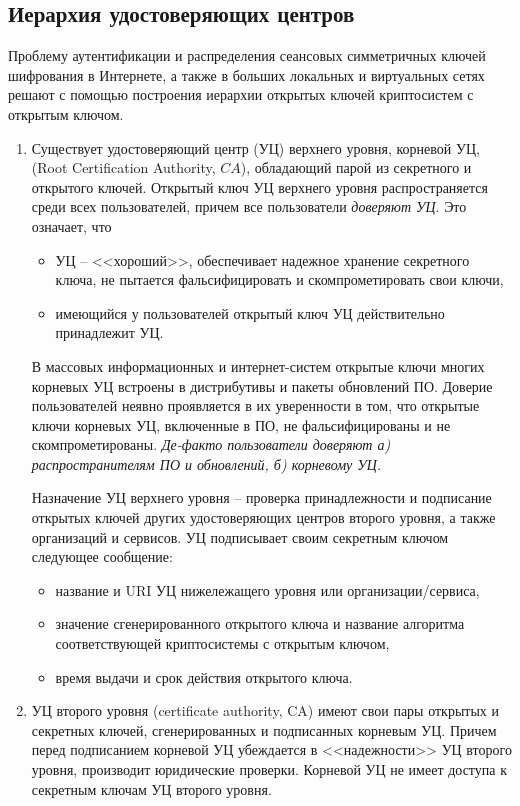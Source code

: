 ﻿\subsection{Иерархия удостоверяющих центров}

Проблему аутентификации и распределения сеансовых симметричных ключей шифрования в Интернете, а также в больших локальных и виртуальных сетях решают с помощью построения иерархии открытых ключей криптосистем с открытым ключом.

\begin{enumerate}
    \item Существует удостоверяющий центр (УЦ) верхнего уровня, корневой УЦ, (Root Certification Authority, $CA$), обладающий парой из секретного и открытого ключей. Открытый ключ УЦ верхнего уровня распространяется среди всех пользователей, причем все пользователи \emph{доверяют УЦ}. Это означает, что
        \begin{itemize}
            \item УЦ -- <<хороший>>, обеспечивает надежное хранение секретного ключа, не пытается фальсифицировать и скомпрометировать свои ключи,
            \item имеющийся у пользователей открытый ключ УЦ действительно принадлежит УЦ.
        \end{itemize}
        В массовых информационных и интернет-систем открытые ключи многих корневых УЦ встроены в дистрибутивы и пакеты обновлений ПО. Доверие пользователей неявно проявляется в их уверенности в том, что открытые ключи корневых УЦ, включенные в ПО, не фальсифицированы и не скомпрометированы. \emph{Де-факто пользователи доверяют а) распространителям ПО и обновлений, б) корневому УЦ.}

        Назначение УЦ верхнего уровня -- проверка принадлежности и подписание открытых ключей других удостоверяющих центров второго уровня, а также организаций и сервисов. УЦ подписывает своим секретным ключом следующее сообщение:
        \begin{itemize}
            \item название и URI УЦ нижележащего уровня или организации/сервиса,
            \item значение сгенерированного открытого ключа и название алгоритма соответствующей криптосистемы с открытым ключом,
            \item время выдачи и срок действия открытого ключа.
        \end{itemize}

    \item УЦ второго уровня (certificate authority, CA) имеют свои пары открытых и секретных ключей, сгенерированных и подписанных корневым УЦ. Причем перед подписанием корневой УЦ убеждается в <<надежности>> УЦ второго уровня, производит юридические проверки. Корневой УЦ не имеет доступа к секретным ключам УЦ второго уровня.


\end{enumerate}
